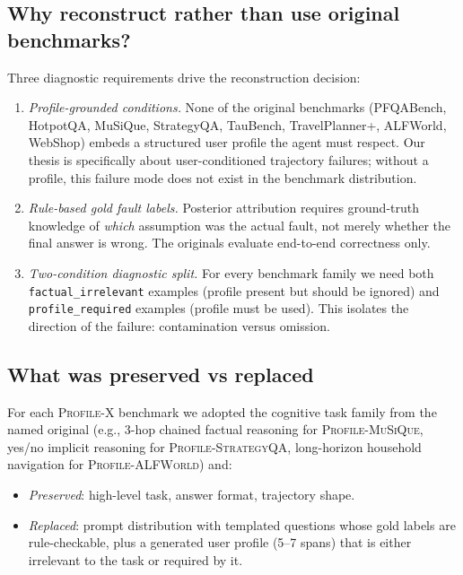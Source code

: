 
\subsection{Why reconstruct rather than use original benchmarks?}

Three diagnostic requirements drive the reconstruction decision:
\begin{enumerate}[leftmargin=*,itemsep=2pt,topsep=2pt]
\item \emph{Profile-grounded conditions.} None of the original
benchmarks (PFQABench, HotpotQA, MuSiQue, StrategyQA, TauBench,
TravelPlanner+, ALFWorld, WebShop) embeds a structured user profile
the agent must respect. Our thesis is specifically about
user-conditioned trajectory failures; without a profile, this
failure mode does not exist in the benchmark distribution.
\item \emph{Rule-based gold fault labels.} Posterior attribution
requires ground-truth knowledge of \emph{which} assumption was the
actual fault, not merely whether the final answer is wrong. The
originals evaluate end-to-end correctness only.
\item \emph{Two-condition diagnostic split.} For every benchmark
family we need both \texttt{factual\_irrelevant} examples (profile
present but should be ignored) and \texttt{profile\_required}
examples (profile must be used). This isolates the direction of
the failure: contamination versus omission.
\end{enumerate}

\subsection{What was preserved vs replaced}

For each \textsc{Profile-X} benchmark we adopted the cognitive
task family from the named original (e.g., 3-hop chained factual
reasoning for \textsc{Profile-MuSiQue}, yes/no implicit reasoning
for \textsc{Profile-StrategyQA}, long-horizon household navigation
for \textsc{Profile-ALFWorld}) and:
\begin{itemize}[leftmargin=*,itemsep=2pt,topsep=2pt]
\item \emph{Preserved}: high-level task, answer format, trajectory shape.
\item \emph{Replaced}: prompt distribution with templated questions
whose gold labels are rule-checkable, plus a generated user profile
(5--7 spans) that is either irrelevant to the task or required by it.
\end{itemize}


